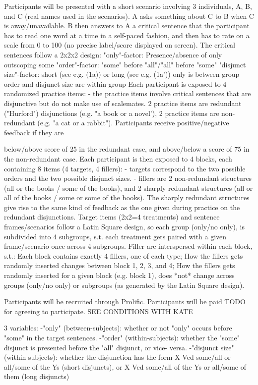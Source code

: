 Participants will be presented with a short scenario involving 3 individuals, A, B, and C (real names used
in the scenarios). A asks something about C to B when C is away/unavailable. B then answers to A a
critical sentence that the participant has to read one word at a time in a self-paced fashion, and then has
to rate on a scale from 0 to 100 (no precise label/score displayed on screen).
The critical sentences follow a 2x2x2 design:
"only"-factor: Presence/absence of only outscoping some
"order"-factor: "some" before "all"/"all" before "some"
"disjunct size"-factor: short (see e.g. (1a)) or long (see e.g. (1a'))
only is between group
order and disjunct size are within-group
Each participant is exposed to 4 randomized practice items:
- the practice items involve critical sentences that are disjunctive but do not make use of scalemates. 2
practice items are redundant ("Hurford") disjunctions (e.g. "a book or a novel'), 2 practice items are non-
redundant (e.g. "a cat or a rabbit"). Participants receive positive/negative feedback if they are


below/above score of 25 in the redundant case, and above/below a score of 75 in the non-redundant
case.
Each participant is then exposed to 4 blocks, each containing 8 items (4 targets, 4 fillers):
- targets correspond to the two possible orders and the two possible disjunct sizes.
- fillers are 2 non-redundant structures (all or the books / some of the books), and 2 sharply redundant
structures (all or all of the books / some or some of the books). The sharply redundant structures give
rise to the same kind of feedback as the one given during practice on the redundant disjunctions.
Target items (2x2=4 treatments) and sentence frames/scenarios follow a Latin Square design, so each
group (only/no only), is subdivided into 4 subgroups, s.t. each treatment gets paired with a given
frame/scenario once across 4 subgroups.
Filler are interspersed within each block, s.t.:
Each block contains exactly 4 fillers, one of each type;
How the fillers gets randomly inserted changes between block 1, 2, 3, and 4;
How the fillers gets randomly inserted for a given block (e.g. block 1), does *not* change across groups
(only/no only) or subgroups (as generated by the Latin Square design).

Participants will be recruited through Prolific. Participants will be paid TODO for agreeing to participate.
SEE CONDITIONS WITH KATE

3 variables:
-"only" (between-subjects): whether or not "only" occurs before "some" in the target sentences.
-"order" (within-subjects): whether the "some" disjunct is presented before the "all" disjunct, or vice-
versa.
-"disjunct size" (within-subjects): whether the disjunction has the form X Ved some/all or all/some of the
Ys (short disjuncts), or X Ved some/all of the Ys or all/some of them (long disjuncts)


